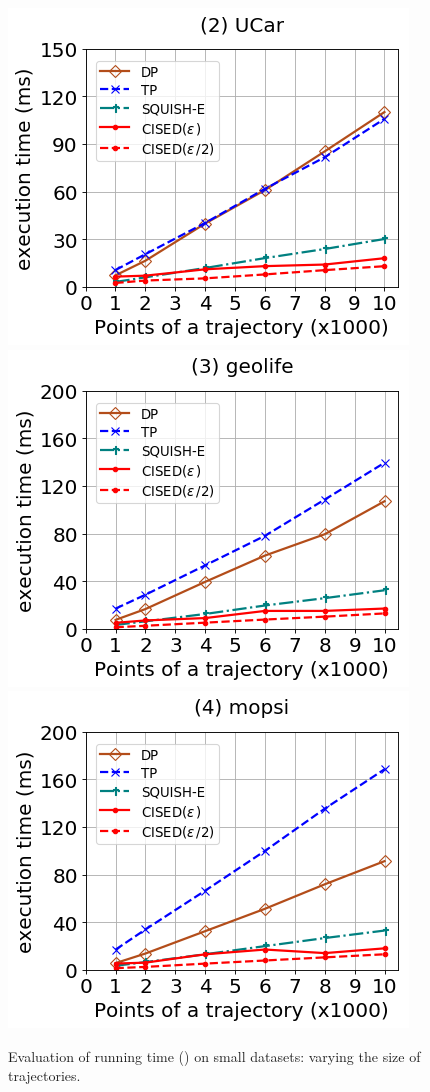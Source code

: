 \begin{figure}[tb!]
	\centering
	\includegraphics[scale=0.320]{Figures/Exp-SED-time-size-service.png}	\hspace{3ex}
	\includegraphics[scale=0.320]{Figures/Exp-SED-time-size-geolife.png}	\hspace{3ex}
	\includegraphics[scale=0.320]{Figures/Exp-SED-time-size-mopsi.png}	
	\vspace{-2ex}
	\caption{\small Evaluation of running time (\sed) on small datasets: varying the size of trajectories.}\label{fig:time-size-sed}
	\vspace{-2ex}
\end{figure}

